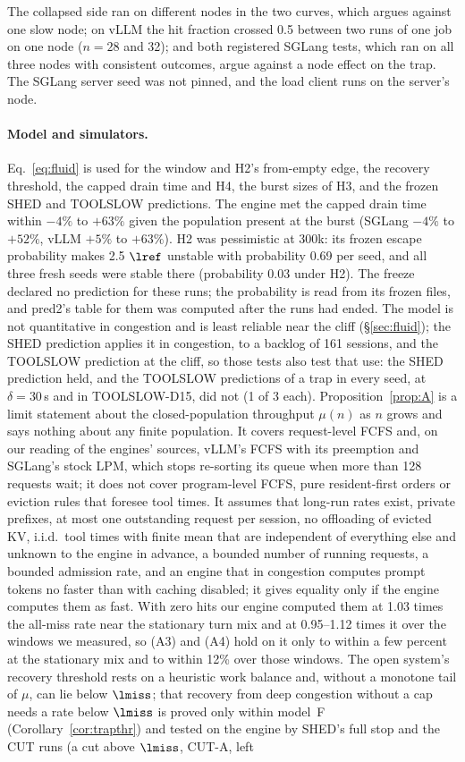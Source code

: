 The collapsed side ran on different nodes in the two curves, which argues against one slow node; on vLLM the hit fraction crossed 0.5 between two runs of one job on one node ($n=28$ and 32); and both registered SGLang tests, which ran on all three nodes with consistent outcomes, argue against a node effect on the trap. The SGLang server seed was not pinned, and the load client runs on the server's node.

\paragraph{Model and simulators.} Eq.~\eqref{eq:fluid} is used for the window and H2's from-empty edge, the recovery threshold, the capped drain time and H4, the burst sizes of H3, and the frozen SHED and TOOLSLOW predictions. The engine met the capped drain time within $-4\%$ to $+63\%$ given the population present at the burst (SGLang $-4\%$ to $+52\%$, vLLM $+5\%$ to $+63\%$). H2 was pessimistic at 300k: its frozen escape probability makes 2.5 $\lref$ unstable with probability 0.69 per seed, and all three fresh seeds were stable there (probability 0.03 under H2). The freeze declared no prediction for these runs; the probability is read from its frozen files, and pred2's table for them was computed after the runs had ended. The model is not quantitative in congestion and is least reliable near the cliff (\S\ref{sec:fluid}); the SHED prediction applies it in congestion, to a backlog of 161 sessions, and the TOOLSLOW prediction at the cliff, so those tests also test that use: the SHED prediction held, and the TOOLSLOW predictions of a trap in every seed, at $\delta=30$\,s and in TOOLSLOW-D15, did not (1 of 3 each). Proposition~\ref{prop:A} is a limit statement about the closed-population throughput $\mu(n)$ as $n$ grows and says nothing about any finite population. It covers request-level FCFS and, on our reading of the engines' sources, vLLM's FCFS with its preemption and SGLang's stock LPM, which stops re-sorting its queue when more than 128 requests wait; it does not cover program-level FCFS, pure resident-first orders or eviction rules that foresee tool times. It assumes that long-run rates exist, private prefixes, at most one outstanding request per session, no offloading of evicted KV, i.i.d.\ tool times with finite mean that are independent of everything else and unknown to the engine in advance, a bounded number of running requests, a bounded admission rate, and an engine that in congestion computes prompt tokens no faster than with caching disabled; it gives equality only if the engine computes them as fast. With zero hits our engine computed them at 1.03 times the all-miss rate near the stationary turn mix and at 0.95--1.12 times it over the windows we measured, so (A3) and (A4) hold on it only to within a few percent at the stationary mix and to within 12\% over those windows. The open system's recovery threshold rests on a heuristic work balance and, without a monotone tail of $\mu$, can lie below $\lmiss$; that recovery from deep congestion without a cap needs a rate below $\lmiss$ is proved only within model~F (Corollary~\ref{cor:trapthr}) and tested on the engine by SHED's full stop and the CUT runs (a cut above $\lmiss$, CUT-A, left 